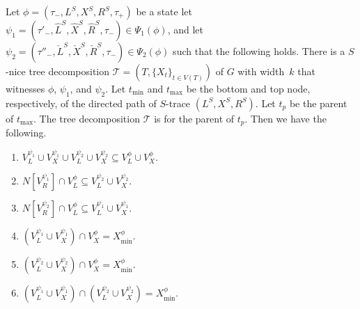 \documentclass[a4paper,UKenglish,cleveref, autoref, thm-restate, numberwithinsect]{lipics-v2021}
\newcommand{\slim}{\text{slim}\xspace}
\newcommand{\topheavy}{\text{top-heavy}\xspace}
\begin{document}
\begin{lemma}\label{lem:legal2}
Let $\phi=(\tau_-,L^S, X^S, R^S,\tau_+)$ be a state let $\psi_1=(\tau'_-,\hat{L}^S, \hat{X}^S, \hat{R}^S,\tau_-)\in\Psi_1(\phi)$, and let $\psi_2=(\tau''_-,\check{L}^S, \check{X}^S, \check{R}^S,\tau_-)\in\Psi_2(\phi)$ such that the following holds.
There is a \slim $S$-nice tree decomposition $\mathcal{T}=(T,\{X_t\}_{t\in V(T)})$ of $G$ with width~$k$ that witnesses $\phi$, $\psi_1$, and $\psi_2$. Let $t_{\min}$ and $t_{\max}$ be the bottom and top node, respectively, of the directed path of $S$-trace $(L^S, X^S, R^S)$. Let $t_p$ be the parent of $t_{\max}$. 
The tree decomposition $\mathcal{T}$ is \topheavy for the parent of $t_p$.
Then we have the following.
\begin{enumerate}
\item $V^{\psi_1}_L\cup V^{\psi_1}_X\cup V^{\psi_2}_L\cup V^{\psi_2}_X \subseteq V^\phi_L\cup V^\phi_X$.
\item $N[V^{\psi_1}_R]\cap V^\phi_L\subseteq V^{\psi_2}_L\cup V^{\psi_2}_X$.
\item $N[V^{\psi_2}_R]\cap V^\phi_L\subseteq V^{\psi_1}_L\cup V^{\psi_1}_X$.
\item $(V^{\psi_1}_L\cup V^{\psi_1}_X)\cap V^\phi_X= X^\phi_{\min}$.
\item $(V^{\psi_2}_L\cup V^{\psi_2}_X)\cap V^\phi_X= X^\phi_{\min}$.
\item $(V^{\psi_1}_L\cup V^{\psi_1}_X)\cap (V^{\psi_2}_L\cup V^{\psi_2}_X)= X^\phi_{\min}$.
\end{enumerate}
\end{lemma}
\end{document}

